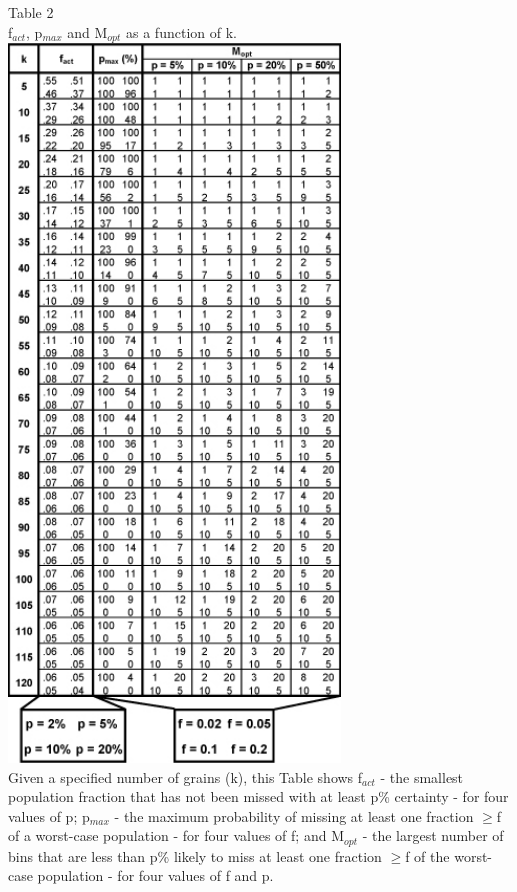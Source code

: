 \documentclass[12]{article}
\begin{document}
\begin{minipage}[c]{\textwidth}
Table 2\\ f$_{act}$, p$_{max}$ and  M$_{opt}$ as a function of k.\\
   \includegraphics[height = 7.5in]{table2.jpg}\\
\label{tab:2}
Given a specified  number of grains (k), this  Table shows f$_{act}$ -
the  smallest population  fraction that  has not  been missed  with at
least p\%  certainty - for four  values of p; p$_{max}$  - the maximum
probability of missing  at least one fraction $\geq$f  of a worst-case
population - for four values of  f; and M$_{opt}$ - the largest number
of bins  that are less than p\%  likely to miss at  least one fraction
$\geq$f of the worst-case population - for four values of f and p.
\end{minipage}
\end{document}

